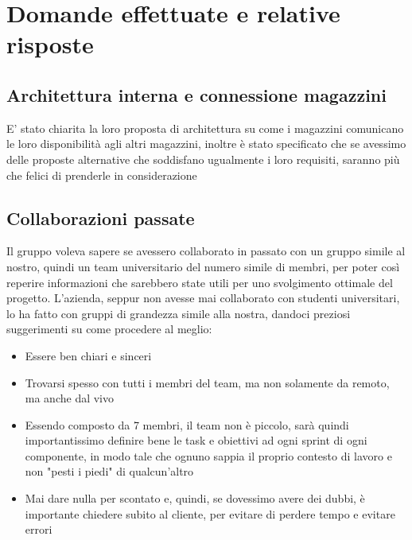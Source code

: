 \documentclass[italian, 12pt]{article}
\begin{document}
\section{Domande effettuate e relative risposte}
\subsection{Architettura interna e connessione magazzini}
E' stato chiarita la loro proposta di architettura su come i magazzini comunicano le loro disponibilità agli altri magazzini, inoltre è stato specificato che se avessimo delle proposte alternative che soddisfano ugualmente i loro requisiti, saranno più che felici di prenderle in considerazione

\subsection{Collaborazioni passate}
Il gruppo voleva sapere se avessero collaborato in passato con un gruppo simile al nostro, quindi un team universitario del numero simile di membri, per poter così reperire informazioni che sarebbero state utili per uno svolgimento ottimale del progetto. L'azienda, seppur non avesse mai collaborato con studenti universitari, lo ha fatto con gruppi di grandezza simile alla nostra, dandoci preziosi suggerimenti su come procedere al meglio:
\begin{itemize}
    \item Essere ben chiari e sinceri
    \item Trovarsi spesso con tutti i membri del team, ma non solamente da remoto, ma anche dal vivo
    \item Essendo composto da 7 membri, il team non è piccolo, sarà quindi importantissimo definire bene le task e obiettivi ad ogni sprint di ogni componente, in modo tale che ognuno sappia il proprio contesto di lavoro e non "pesti i piedi" di qualcun'altro
    \item Mai dare nulla per scontato e, quindi, se dovessimo avere dei dubbi, è importante chiedere subito al cliente, per evitare di perdere tempo e evitare errori
\end{itemize}
\end{document}
